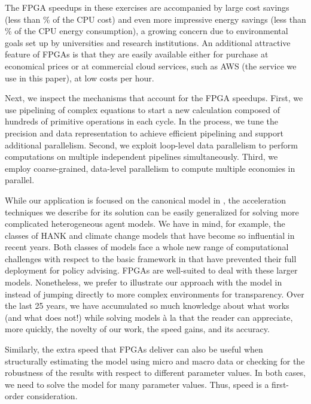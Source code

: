 \documentclass[12pt,american]{article}
\newcommand{\resultsfolder}{./results}
\newcommand{\costupperbound}{}
\newcommand{\energyupperbound}{}
\begin{document}
The FPGA speedups in these exercises are accompanied by large cost savings (less than \costupperbound\hspace{-0.1cm}\% of the CPU cost) and even more impressive energy savings (less than \energyupperbound\hspace{-0.1cm}\% of the CPU energy consumption), a growing concern due to environmental goals set up by universities and research institutions. An additional attractive feature of FPGAs is that they are easily available either for purchase at economical prices or at commercial cloud services, such as AWS (the service we use in this paper), at low costs per hour.

Next, we inspect the mechanisms that account for the FPGA speedups. First, we use pipelining of complex equations to start a new calculation composed of hundreds of primitive operations in each cycle. In the process, we tune the precision and data representation to achieve efficient pipelining and support additional parallelism. Second, we exploit loop-level data parallelism to perform computations on multiple independent pipelines simultaneously. Third, we employ coarse-grained, data-level parallelism to compute multiple economies in parallel.

While our application is focused on the canonical model in \citet{DenHaan2010_model}, the acceleration techniques we describe for its solution can be easily generalized for solving more complicated heterogeneous agent models. We have in mind, for example, the classes of HANK \citep{Kaplan2018, Bayer2019} and climate change models \citep{Cai2019, Rossi2021, KrusellSmith2022} that have become so influential in recent years. Both classes of models face a whole new range of computational challenges with respect to the basic framework in \citet{KrusellSmith1998} that have prevented their full deployment for policy advising. FPGAs are well-suited to deal with these larger models. Nonetheless, we prefer to illustrate our approach with the model in \citet{DenHaan2010_model} instead of jumping directly to more complex environments for transparency. Over the last 25 years, we have accumulated so much knowledge about what works (and what does not!) while solving models \`a la \citet{KrusellSmith1998} that the reader can appreciate, more quickly, the novelty of our work, the speed gains, and its accuracy.

Similarly, the extra speed that FPGAs deliver can also be useful when structurally estimating the model using micro and macro data or checking for the robustness of the results with respect to different parameter values. In both cases, we need to solve the model for many parameter values. Thus, speed is a first-order consideration.
\end{document}
